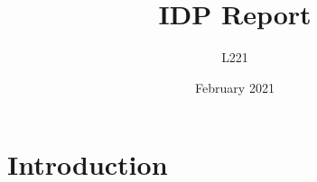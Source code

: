 \documentclass{article}
\title{IDP Report}
\author{L221}
\date{February 2021}
\begin{document}
\maketitle

\section{Introduction}
\end{document}
